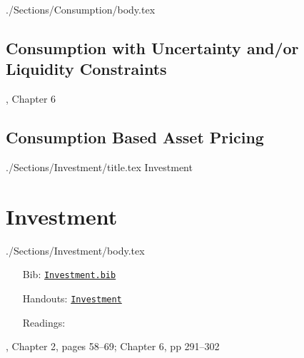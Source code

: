 \documentclass{\econtex}\newcommand{\texname}{Syllabus}
\begin{document}
\begin{verbatimwrite}{./Sections/Consumption/body.tex}
\subsection{Consumption with Uncertainty and/or Liquidity Constraints}

\bi
\reqd \dt, Chapter 6
\recm \cite{zeldes_jpe89}
\recm \cite{caballero:jme}
\recm \cite{deatonLiqConstr}
\recm \cite{toche:urisk}
\reqd \cite{carroll:atheorynberwp}
\reqd \cite{CarrollKimballPSPW}
\reqd \cite{carroll&summers:cparallelsy}
\recm \cite{BufferStockTheory}
\recm \cite{carroll:death}
\ei

\subsection{Consumption Based Asset Pricing}

\bi
\reqd \cite{lucas:assetpricing}
\reqd \cite{mehraPrescottPuzzle}
\recm \cite{blanchard:burstingbubbles}
\recm \cite{carrollIrrational}
\ei
\end{verbatimwrite}



\ifPost
{} 
\fi


\begin{verbatimwrite}{./Sections/Investment/title.tex}
Investment
\end{verbatimwrite}

\section{Investment}\label{sec:Investment}
\begin{verbatimwrite}{./Sections/Investment/body.tex}
\begin{itemize}
\item[Bib:] \texttt{\href{http://www.econ2.jhu.edu/people/ccarroll/courses/Choice/Syllabus/Investment.bib}{Investment.bib}}
\item[Handouts:]  \texttt{\href{http://www.econ2.jhu.edu/people/ccarroll/courses/choice/LectureNotes/Investment}{Investment}}
\item[Readings:]
\end{itemize}

\providecommand{\blf}{\cite{blanchard&fischer:text}}
\providecommand{\ro}{\cite{romer:text}}

\bi
\reqd \blf, Chapter 2, pages 58--69; Chapter 6, pp 291--302
\recm \cite{hall&jorgenson:i}
\reqd \cite{hayashi:q}
\reqd \cite{abel&eberly:unified}
\reqd \cite{chh:reconsider}
\ei

\end{verbatimwrite}
\end{document}
